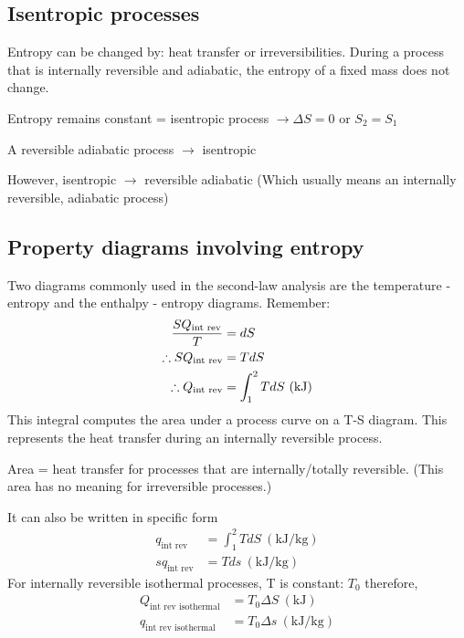 \subsection{Isentropic processes}
Entropy can be changed by: heat transfer or irreversibilities. During a process that is internally reversible and adiabatic, the entropy of a fixed mass does not change.
\begin{center}
  Entropy remains constant = isentropic process \(\rightarrow \Delta S = 0 \textrm{ or } S_2 = S_1 \)
\end{center}
\begin{center}
  A reversible adiabatic process \(\rightarrow\) isentropic
\end{center}
\begin{center}
  However, isentropic \(\rightarrow\) reversible adiabatic (Which usually means an internally reversible, adiabatic process)
\end{center}
\subsection{Property diagrams involving entropy}
Two diagrams commonly used in the second-law analysis are the temperature - entropy and the enthalpy - entropy diagrams. Remember:
\begin{align}
  \frac{SQ_{\textrm{int rev}}}{T}           & = dS                                 \\
  \therefore SQ_{\textrm{\textrm{int rev}}} & = TdS                                \\
  \therefore Q_{\textrm{int rev}}           & = \int_1^2 T dS \ (\si{\kilo\joule})
\end{align}
This integral computes the area under a process curve on a T-S diagram. This represents the heat transfer during an internally reversible process.
\begin{center}
  Area = heat transfer for processes that are internally/totally reversible. (This area has no meaning for irreversible processes.)
\end{center}
It can also be written in specific form
\begin{align}
  q_{\textrm{int rev}}  & = \int_1^2 TdS \ (\si{\kilo\joule\per\kg}) \\
  sq_{\textrm{int rev}} & = T ds \ (\si{\kilo\joule\per\kg})
\end{align}
For internally reversible isothermal processes, T is constant: \(T_0\) therefore,
\begin{align}
  Q_{\textrm{int rev isothermal}} & = T_0 \Delta S \ (\si{\kilo\joule})        \\
  q_{\textrm{int rev isothermal}} & = T_0 \Delta s \ (\si{\kilo\joule\per\kg})
\end{align}

